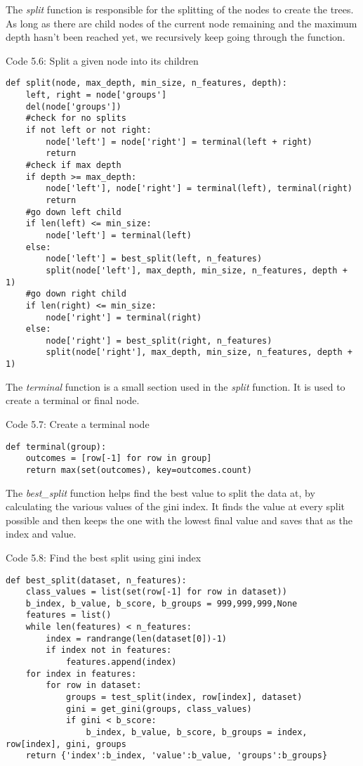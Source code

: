 The \textit{split} function is responsible for the splitting of the nodes to create the trees. As long as there are child nodes of the current node remaining and the maximum depth hasn't been reached yet, we recursively keep going through the function.
\begin{center} 
Code 5.6: Split a given node into its children
\end{center}
\begin{lstlisting}
def split(node, max_depth, min_size, n_features, depth):
    left, right = node['groups']
    del(node['groups'])
    #check for no splits
    if not left or not right:
        node['left'] = node['right'] = terminal(left + right)
        return
    #check if max depth
    if depth >= max_depth:
        node['left'], node['right'] = terminal(left), terminal(right)
        return
    #go down left child
    if len(left) <= min_size:
        node['left'] = terminal(left)
    else:
        node['left'] = best_split(left, n_features)
        split(node['left'], max_depth, min_size, n_features, depth + 1)
    #go down right child
    if len(right) <= min_size:
        node['right'] = terminal(right)
    else:
        node['right'] = best_split(right, n_features)
        split(node['right'], max_depth, min_size, n_features, depth + 1)
\end{lstlisting}

The \textit{terminal} function is a small section used in the \textit{split} function. It is used to create a terminal or final node. 
\begin{center} 
Code 5.7: Create a terminal node
\end{center}
\begin{lstlisting}
def terminal(group):
    outcomes = [row[-1] for row in group]
    return max(set(outcomes), key=outcomes.count)
\end{lstlisting}

The \textit{best\_split} function helps find the best value to split the data at, by calculating the various values of the gini index. It finds the value at every split possible and then keeps the one with the lowest final value and saves that as the index and value. 
\begin{center} 
Code 5.8: Find the best split using gini index
\end{center}
\begin{lstlisting}
def best_split(dataset, n_features):
    class_values = list(set(row[-1] for row in dataset))
    b_index, b_value, b_score, b_groups = 999,999,999,None
    features = list()
    while len(features) < n_features:
        index = randrange(len(dataset[0])-1)
        if index not in features:
            features.append(index)
    for index in features:
        for row in dataset:
            groups = test_split(index, row[index], dataset)
            gini = get_gini(groups, class_values)
            if gini < b_score:
                b_index, b_value, b_score, b_groups = index, row[index], gini, groups
    return {'index':b_index, 'value':b_value, 'groups':b_groups}
\end{lstlisting}

